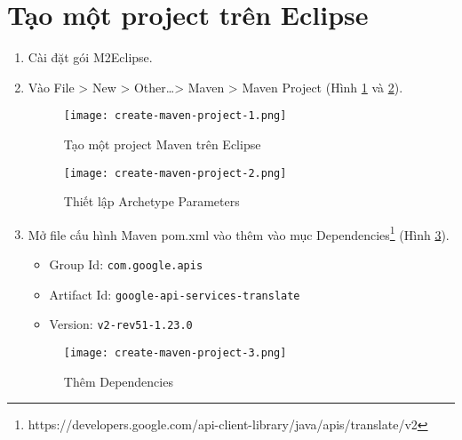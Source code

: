 \documentclass[../thesis.tex]{subfiles}
\begin{document}
\section{Tạo một project trên Eclipse}
\begin{enumerate}
	\item Cài đặt gói M2Eclipse.
	\item Vào File > New > Other\ldots > Maven > Maven Project (Hình \ref{Tao mot project Maven tren Eclipse} và \ref{Thiet lap Archetype Parameters}).
	
	\begin{figure}
		\texttt{[image: create-maven-project-1.png]}
		\caption{Tạo một project Maven trên Eclipse}
		\label{Tao mot project Maven tren Eclipse}
	\end{figure}
	\begin{figure}
		\texttt{[image: create-maven-project-2.png]}
		\caption{Thiết lập Archetype Parameters}
		\label{Thiet lap Archetype Parameters}
	\end{figure}
	
	\item Mở file cấu hình Maven pom.xml vào thêm vào mục Dependencies\footnote{https://developers.google.com/api-client-library/java/apis/translate/v2} (Hình \ref{Them Dependencies}).
	
	\begin{itemize}
		\item Group Id: \lstinline{com.google.apis}
		\item Artifact Id: \lstinline{google-api-services-translate}
		\item Version: \lstinline{v2-rev51-1.23.0}
	\end{itemize}
	
	\begin{figure}
		\texttt{[image: create-maven-project-3.png]}
		\caption{Thêm Dependencies}
		\label{Them Dependencies}
	\end{figure}
	
\end{enumerate}
\end{document}
